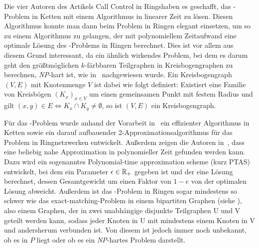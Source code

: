 Die vier Autoren des Artikels \glqq Call Control in Rings\grqq haben es geschafft, das \CallControl-Problem in Ketten mit
einem Algorithmus in linearer Zeit zu lösen.
Diesen Algorithmus konnte man dann beim Problem in Ringen elegant einsetzen, um so zu einem Algorithmus zu gelangen, der mit polynomiellem Zeitaufwand
eine optimale Lösung des \CallControl-Problems in Ringen berechnet.
Dies ist vor allem aus diesem Grund interessant, da ein ähnlich wirkendes Problem, bei dem es darum geht den größtmöglichen $k$-färbbaren 
Teilgraphen in Kreisbogengraphen zu berechnen, {\em NP}-hart ist, wie in~\cite{circular-arc} nachgewiesen wurde.
Ein Kreisbogengraph $(V,E)$ mit Knotenmenge $V$ ist dabei wie folgt definiert: 
Existiert eine Familie von Kreisbögen $(K_x)_{x\in V}$ um einen gemeinsamen Punkt mit festem Radius 
und gilt $(x,y)\in E \Leftrightarrow K_x \cap K_y \neq \emptyset$, so ist $(V,E)$ ein Kreisbogengraph.

Für das \WeightedCallControl-Problem wurde anhand der Vorarbeit in~\cite{carlisle} ein effizienter Algorithmus in Ketten sowie ein darauf
aufbauender 2-Approximationsalgorithmus für das Problem in Ringnetzwerken entwickelt.
Außerdem zeigen die Autoren in~\cite{paper}, dass eine beliebig nahe Approximation in polynomieller Zeit gefunden werden kann.
Dazu wird ein sogenanntes Polynomial-time approximation scheme (kurz PTAS) entwickelt, bei dem ein Parameter $\epsilon \in \mathbb R_+$ gegeben ist
und der eine Lösung berechnet, dessen Gesamtgewicht um einen Faktor von $1-e$ von der optimalen Lösung abweicht.
Außerdem ist das \WeightedCallControl-Problem in Ringen sogar mindestens so schwer wie das exact-matching-Problem in einem bipartiten Graphen (siehe \cite{hochbaum-levin}),
also einem Graphen, der in zwei unabhängige disjunkte Teilgraphen U und V geteilt werden kann, sodass jeder Knoten in U mit mindestens einem Knoten in V und andersherum verbunden ist.
Von diesem ist jedoch immer noch unbekannt, ob es in $P$ liegt oder ob es ein {\em NP}-hartes Problem darstellt.